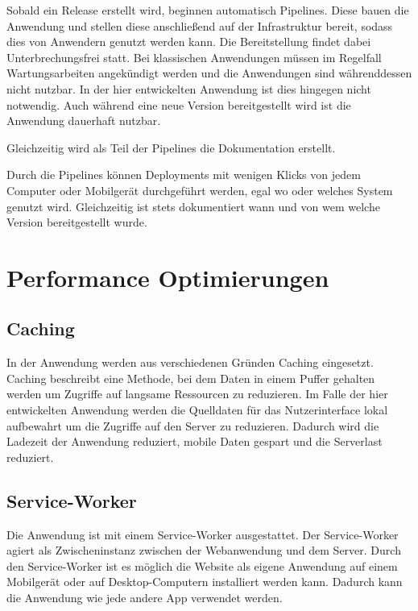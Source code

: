 Sobald ein Release erstellt wird, beginnen automatisch Pipelines.
Diese bauen die Anwendung und stellen diese anschließend auf der Infrastruktur bereit, sodass dies von Anwendern genutzt werden kann.
Die Bereitstellung findet dabei Unterbrechungsfrei statt.
Bei klassischen Anwendungen müssen im Regelfall Wartungsarbeiten angekündigt werden und die Anwendungen sind währenddessen nicht nutzbar.
In der hier entwickelten Anwendung ist dies hingegen nicht notwendig.
Auch während eine neue Version bereitgestellt wird ist die Anwendung dauerhaft nutzbar.

Gleichzeitig wird als Teil der Pipelines die Dokumentation erstellt.

Durch die Pipelines können Deployments mit wenigen Klicks von jedem Computer oder Mobilgerät durchgeführt werden, egal wo oder welches System genutzt wird.
Gleichzeitig ist stets dokumentiert wann und von wem welche Version bereitgestellt wurde.







\section{Performance Optimierungen}
\subsection{Caching}
In der Anwendung werden aus verschiedenen Gründen Caching eingesetzt.
Caching beschreibt eine Methode, bei dem Daten in einem Puffer gehalten werden um Zugriffe auf langsame Ressourcen zu reduzieren.
Im Falle der hier entwickelten Anwendung werden die Quelldaten für das Nutzerinterface lokal aufbewahrt um die Zugriffe auf den Server zu reduzieren.
Dadurch wird die Ladezeit der Anwendung reduziert, mobile Daten gespart und die Serverlast reduziert.






\subsection{Service-Worker}
Die Anwendung ist mit einem Service-Worker ausgestattet.
Der Service-Worker agiert als Zwischeninstanz zwischen der Webanwendung und dem Server.
Durch den Service-Worker ist es möglich die Website als eigene Anwendung auf einem Mobilgerät oder auf Desktop-Computern installiert werden kann.
Dadurch kann die Anwendung wie jede andere App verwendet werden.



